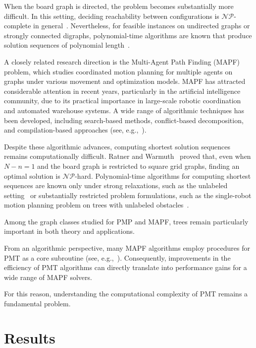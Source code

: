 \documentclass[letter,11pt]{article}
\theoremstyle{definition}
\def\NP{{$\mathcal{NP}$}}
\theoremstyle{definition}
\newcommand{\1}{\boldmath$~1~$\unboldmath}
\def\NP{{$\mathcal{NP}$}}
\newcounter{aaa}
\begin{document}
When the board graph is directed, the problem becomes substantially more difficult.
In this setting, deciding reachability between configurations is
\NP-complete in general~\cite{WOS:001155044500001}.
Nevertheless, for feasible instances on undirected graphs
or strongly connected digraphs,
polynomial-time algorithms are known that produce solution sequences
of polynomial length~\cite{715921, WOS:000077614700003,
WOS:001177663400002, WOS:001155044500001, ARDIZZONI2025104372}.


A closely related research direction is the Multi-Agent Path Finding (MAPF) problem,
which studies coordinated motion planning for multiple agents on graphs
under various movement and optimization models.
MAPF has attracted considerable attention in recent years,
particularly in the artificial intelligence community,
due to its practical importance in large-scale robotic coordination
and automated warehouse systems.
A wide range of algorithmic techniques has been developed,
including search-based methods, conflict-based decomposition,
and compilation-based approaches
(see, e.g.,~\cite{10.5555/3463952.3464166,
Ma_2021, 
Huang_Li_Koenig_Dilkina_2022, 
DBLP:journals/corr/abs-2305-16303,
10.1609/aaai.v39i22.34501}).

Despite these algorithmic advances,
computing shortest solution sequences remains computationally difficult.
Ratner and Warmuth~\cite{zbMATH04155895} proved that,
even when $N-n=1$ and the board graph is restricted to square grid graphs,
finding an optimal solution is \NP-hard.
Polynomial-time algorithms for computing shortest sequences
are known only under strong relaxations,
such as the unlabeled setting~\cite{WOS:000254460900008}
or substantially restricted problem formulations,
such as the single-robot motion planning problem on trees with 
unlabeled obstacles~\cite{365740}.

Among the graph classes studied for PMP and MAPF,
trees remain particularly important in both theory and applications.

From an algorithmic perspective,
many MAPF algorithms employ procedures for PMT
as a core subroutine
(see, e.g.,~\cite{Khorshid2011APA, 
Krontiris2013FromFT, 
WOS:000948128106003,
WOS:001177663400002}).
Consequently, improvements in the efficiency of PMT algorithms
can directly translate into performance gains
for a wide range of MAPF solvers.

For this reason, understanding the computational complexity of PMT
remains a fundamental problem.


\section{Results}\label{results}
\end{document}
